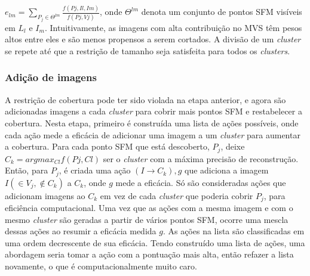 \begin{itemize}
$e_{lm} = \sum_{P_j \in \Theta ^{lm}} \frac{f(Pj,{Il, Im})}{f(Pj, Vj )}$, onde $\Theta ^{lm}$ denota um conjunto de pontos SFM visíveis em $L_l$ e $I_m$. Intuitivamente, as imagens com alta contribuição no MVS têm pesos altos entre eles e são menos propensos a serem cortados. A divisão de um {\it cluster} se repete até que a restrição de tamanho seja satisfeita para todos os {\it clusters}.

\subsubsection{Adição de imagens}
A restrição de cobertura pode ter sido violada na etapa anterior, e agora são adicionadas imagens a cada {\it cluster} para cobrir mais pontos SFM e restabelecer a cobertura. Nesta etapa, primeiro é construída uma lista de ações possíveis, onde cada ação mede a eficácia de adicionar uma imagem a um {\it cluster} para aumentar a cobertura. Para cada ponto SFM que está descoberto, $P_j$, deixe $C_k = argmax_{Cl} f(Pj, Cl)$ ser o {\it cluster} com a máxima precisão de reconstrução. 
Então, para $P_j$, é criada uma ação ${(I \rightarrow C_k), g}$ que adiciona a imagem $I (\in V_j, \not\in C_k)$ a $C_k$, onde $g$ mede a eficácia. Só são consideradas ações que adicionam imagens ao $C_k$ em vez de cada {\it cluster} que poderia cobrir $P_j$, para eficiência computacional. Uma vez que as ações com a mesma imagem e com o mesmo {\it cluster} são geradas a partir de vários pontos SFM, ocorre uma mescla dessas ações ao resumir a eficácia medida $g$. As ações na lista são classificadas em uma ordem decrescente de sua eficácia. Tendo construído uma lista de ações, uma abordagem seria tomar a ação com a pontuação mais alta, então refazer a lista novamente, o que é computacionalmente muito caro. 


\end{itemize}
